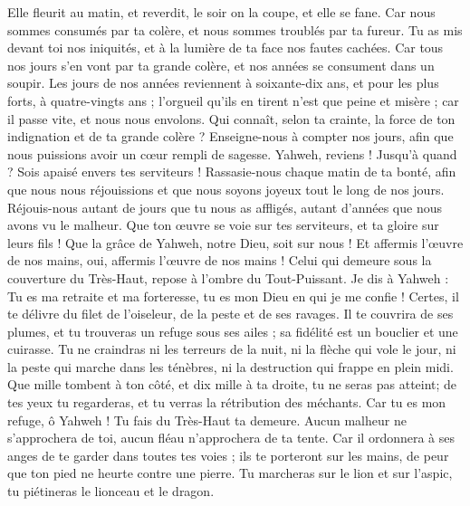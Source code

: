 \begin{multicols}{2}
Elle fleurit au matin, et reverdit, le soir on la coupe, et elle se fane.
Car nous sommes consumés par ta colère, et nous sommes troublés par ta fureur.
Tu as mis devant toi nos iniquités, et à la lumière de ta face nos fautes cachées.
Car tous nos jours s'en vont par ta grande colère, et nos années se consument dans un soupir.
Les jours de nos années reviennent à soixante-dix ans, et pour les plus forts, à quatre-vingts ans ; l'orgueil qu'ils en tirent n'est que peine et misère ; car il passe vite, et nous nous envolons.
Qui connaît, selon ta crainte, la force de ton indignation et de ta grande colère ?
Enseigne-nous à compter nos jours, afin que nous puissions avoir un cœur rempli de sagesse.
Yahweh, reviens ! Jusqu'à quand ? Sois apaisé envers tes serviteurs !
Rassasie-nous chaque matin de ta bonté, afin que nous nous réjouissions et que nous soyons joyeux tout le long de nos jours.
Réjouis-nous autant de jours que tu nous as affligés, autant d'années que nous avons vu le malheur.
Que ton œuvre se voie sur tes serviteurs, et ta gloire sur leurs fils !
Que la grâce de Yahweh, notre Dieu, soit sur nous ! Et affermis l'œuvre de nos mains, oui, affermis l'œuvre de nos mains !
\VerseOne{}Celui qui demeure sous la couverture du Très-Haut, repose à l'ombre du Tout-Puissant.
Je dis à Yahweh : Tu es ma retraite et ma forteresse, tu es mon Dieu en qui je me confie !
Certes, il te délivre du filet de l'oiseleur, de la peste et de ses ravages.
Il te couvrira de ses plumes, et tu trouveras un refuge sous ses ailes ; sa fidélité est un bouclier et une cuirasse.
Tu ne craindras ni les terreurs de la nuit, ni la flèche qui vole le jour,
ni la peste qui marche dans les ténèbres, ni la destruction qui frappe en plein midi.
Que mille tombent à ton côté, et dix mille à ta droite, tu ne seras pas atteint;
de tes yeux tu regarderas, et tu verras la rétribution des méchants.
Car tu es mon refuge, ô Yahweh ! Tu fais du Très-Haut ta demeure.
Aucun malheur ne s'approchera de toi, aucun fléau n'approchera de ta tente.
Car il ordonnera à ses anges de te garder dans toutes tes voies ;
ils te porteront sur les mains, de peur que ton pied ne heurte contre une pierre.
Tu marcheras sur le lion et sur l'aspic, tu piétineras le lionceau et le dragon.

\end{multicols}
